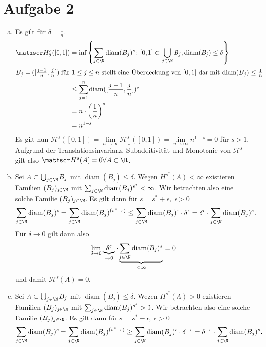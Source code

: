 \documentclass{article}
\newcommand{\diam}{\operatorname{diam}}
\begin{document}
    \section*{Aufgabe 2}
    \begin{enumerate}[(a)]
        \item Es gilt für $\delta = \frac{1}{n}$.
        \begin{align*}
            \mathscr H^s_\delta([0,1]) &= \inf \left\{\sum_{j \in \N} \diam(B_j)^s \colon [0,1] \subset \bigcup_{j\in \N} B_j, \diam(B_j) \leq \delta \right\}\\
            \intertext{$B_j = ([\frac{j-1}{n}, \frac{j}{n}])$ für $1 \leq j \leq n$ stellt eine Überdeckung von $[0,1]$ dar mit $\diam(B_j) \leq \frac{1}{n}$}
            &\leq \sum_{j = 1}^{n} \diam([\frac{j-1}{n}, \frac{j}{n}])^s\\
            &= n \cdot \left(\frac{1}{n}\right)^s\\
            &= n^{1-s}
        \end{align*}
        Es gilt nun $\mathscr H^s([0,1]) = \lim\limits_{n \to \infty} \mathscr H^s_{\frac{1}{n}}([0,1]) = \lim\limits_{n \to \infty} n^{1-s} = 0$ für $s > 1$.
        Aufgrund der Translationsinvarianz, Subadditivität und Monotonie von $\mathscr H^s$ gilt also $\mathscr H^s(A) = 0 \forall A \subset \R$.
        \item Sei $A \subset \bigcup_{j\in \N} B_j$ mit $\diam (B_j) \leq \delta$. Wegen $H^{s^*}(A) < \infty$ existieren Familien $(B_j)_{j\in \N}$ mit $\sum_{j \in \N} \diam(B_j)^{s^*} < \infty$. Wir betrachten also eine solche Familie $(B_j)_{j\in \N}$. 
        Es gilt dann für $s = s^* + \epsilon,\; \epsilon > 0$
        \[
            \sum_{j \in \N} \diam(B_j)^s = \sum_{j \in \N} \diam(B_j)^{(s^* + \epsilon)} \leq \sum_{j \in \N} \diam(B_j)^s \cdot \delta ^\epsilon  = \delta^\epsilon \cdot \sum_{j \in \N} \diam(B_j)^s.
        \]
        Für $\delta \to 0$ gilt dann also 
        \[
            \lim\limits_{\delta \to 0} \underbrace{\delta^\epsilon}_{\to 0} \cdot \underbrace{\sum_{j \in \N} \diam(B_j)^s}_{< \infty} = 0
        \]
        und damit $\mathscr H^s(A) = 0$.
        \item Sei $A \subset \bigcup_{j\in \N} B_j$ mit $\diam (B_j) \leq \delta$. Wegen $H^{s^*}(A) > 0$ existieren Familien $(B_j)_{j\in \N}$ mit $\sum_{j \in \N} \diam(B_j)^{s^*} > 0$. Wir betrachten also eine solche Familie $(B_j)_{j\in \N}$. 
        Es gilt dann für $s = s^* - \epsilon,\; \epsilon > 0$
        \[
            \sum_{j \in \N} \diam(B_j)^s = \sum_{j \in \N} \diam(B_j)^{(s^* - \epsilon)} \geq \sum_{j \in \N} \diam(B_j)^s \cdot \delta ^{-\epsilon}  = \delta^{-\epsilon} \cdot \sum_{j \in \N} \diam(B_j)^s.
\]
\end{enumerate}
\end{document}
